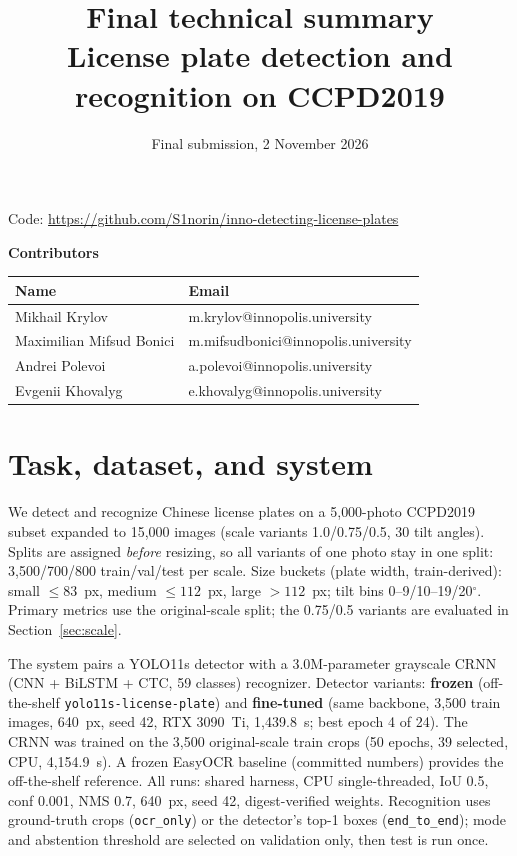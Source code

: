 \documentclass[11pt]{article}
\title{Final technical summary\\ \large License plate detection and recognition on CCPD2019}
\date{Final submission, 2 November 2026}
\begin{document}
\maketitle

\noindent Code: \url{https://github.com/S1norin/inno-detecting-license-plates}

\bigskip
\textbf{Contributors}

\begin{center}
\begin{tabular}{@{}ll@{}}
\toprule
Name & Email \\
\midrule
Mikhail Krylov & m.krylov@innopolis.university \\
Maximilian Mifsud Bonici & m.mifsudbonici@innopolis.university \\
Andrei Polevoi & a.polevoi@innopolis.university \\
Evgenii Khovalyg & e.khovalyg@innopolis.university \\
\bottomrule
\end{tabular}
\end{center}

\section{Task, dataset, and system}

We detect and recognize Chinese license plates on a 5{,}000-photo CCPD2019
subset expanded to 15{,}000 images (scale variants 1.0/0.75/0.5, 30 tilt
angles). Splits are assigned \emph{before} resizing, so all variants of one
photo stay in one split: 3{,}500/700/800 train/val/test per scale. Size
buckets (plate width, train-derived): small $\le 83$~px, medium
$\le 112$~px, large $> 112$~px; tilt bins 0--9/10--19/20$^{\circ}$.
Primary metrics use the original-scale split; the 0.75/0.5 variants are
evaluated in Section~\ref{sec:scale}.

The system pairs a YOLO11s detector with a 3.0M-parameter grayscale CRNN
(CNN + BiLSTM + CTC, 59 classes) recognizer. Detector variants:
\textbf{frozen} (off-the-shelf \texttt{yolo11s-license-plate}) and
\textbf{fine-tuned} (same backbone, 3{,}500 train images, 640~px, seed 42,
RTX 3090~Ti, 1{,}439.8~s; best epoch 4 of 24). The CRNN was trained on the
3{,}500 original-scale train crops (50 epochs, 39 selected, CPU,
4{,}154.9~s). A frozen EasyOCR baseline (committed numbers) provides the
off-the-shelf reference. All runs: shared harness, CPU single-threaded,
IoU 0.5, conf 0.001, NMS 0.7, 640~px, seed 42, digest-verified weights.
Recognition uses ground-truth crops (\texttt{ocr\_only}) or the detector's
top-1 boxes (\texttt{end\_to\_end}); mode and abstention threshold are
selected on validation only, then test is run once.
\end{document}
